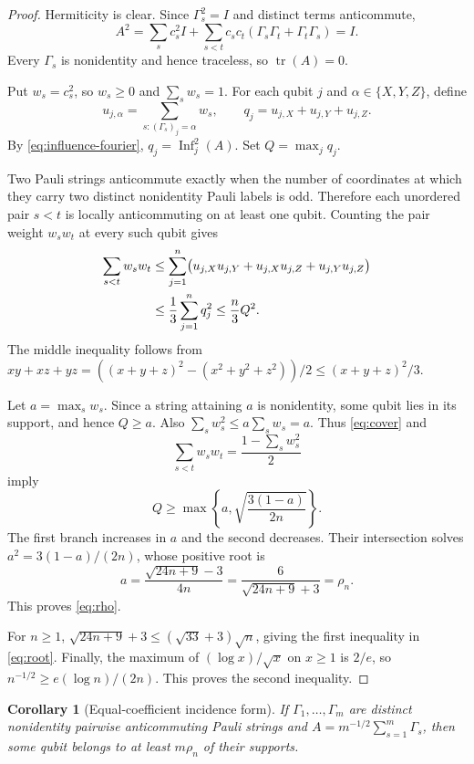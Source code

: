 \documentclass[11pt]{article}
\newtheorem{corollary}[theorem]{Corollary}
\newcommand{\Inf}{\operatorname{Inf}}
\newcommand{\tr}{\operatorname{tr}}
\begin{document}
\begin{proof}
Hermiticity is clear. Since $\Gamma_s^2=I$ and distinct terms anticommute,
\[
 A^2=\sum_s c_s^2I+
 \sum_{s<t}c_sc_t(\Gamma_s\Gamma_t+\Gamma_t\Gamma_s)=I.
\]
Every $\Gamma_s$ is nonidentity and hence traceless, so $\tr(A)=0$.

Put $w_s=c_s^2$, so $w_s\ge0$ and $\sum_sw_s=1$. For each qubit $j$ and
$\alpha\in\{X,Y,Z\}$, define
\[
 u_{j,\alpha}=\sum_{s:(\Gamma_s)_j=\alpha}w_s,
 \qquad
 q_j=u_{j,X}+u_{j,Y}+u_{j,Z}.
\]
By \eqref{eq:influence-fourier}, $q_j=\Inf_j^2(A)$. Set
$Q=\max_jq_j$.

Two Pauli strings anticommute exactly when the number of coordinates at
which they carry two distinct nonidentity Pauli labels is odd. Therefore
each unordered pair $s<t$ is locally anticommuting on at least one qubit.
Counting the pair weight $w_sw_t$ at every such qubit gives
\begin{align}
 \sum_{s<t}w_sw_t
 &\le \sum_{j=1}^n
 \bigl(u_{j,X}u_{j,Y}+u_{j,X}u_{j,Z}+u_{j,Y}u_{j,Z}\bigr)\notag\\
 &\le \frac13\sum_{j=1}^nq_j^2
 \le \frac n3Q^2.\label{eq:cover}
\end{align}
The middle inequality follows from
$xy+xz+yz=( (x+y+z)^2-(x^2+y^2+z^2))/2\le(x+y+z)^2/3$.

Let $a=\max_sw_s$. Since a string attaining $a$ is nonidentity, some
qubit lies in its support, and hence $Q\ge a$. Also
$\sum_sw_s^2\le a\sum_sw_s=a$. Thus \eqref{eq:cover} and
\[
 \sum_{s<t}w_sw_t=\frac{1-\sum_sw_s^2}{2}
\]
imply
\[
 Q\ge \max\left\{a,\sqrt{\frac{3(1-a)}{2n}}\right\}.
\]
The first branch increases in $a$ and the second decreases. Their intersection
solves
$a^2=3(1-a)/(2n)$, whose positive root is
\[
 a=\frac{\sqrt{24n+9}-3}{4n}
  =\frac{6}{\sqrt{24n+9}+3}=\rho_n.
\]
This proves \eqref{eq:rho}.

For $n\ge1$, $\sqrt{24n+9}+3\le(\sqrt{33}+3)\sqrt n$, giving the first
inequality in \eqref{eq:root}. Finally, the maximum of
$(\log x)/\sqrt x$ on $x\ge1$ is $2/e$, so
$n^{-1/2}\ge e(\log n)/(2n)$. This proves the second inequality.
\end{proof}

\begin{corollary}[Equal-coefficient incidence form]
If $\Gamma_1,\dots,\Gamma_m$ are distinct nonidentity pairwise
anticommuting Pauli strings and
$A=m^{-1/2}\sum_{s=1}^m\Gamma_s$, then some qubit belongs to at least
$m\rho_n$ of their supports.
\end{corollary}
\end{document}
